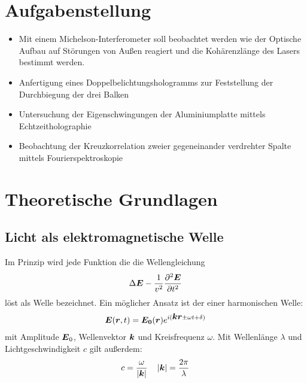 \documentclass[12pt]{article}
\renewcommand*\vec[1]{{\mbox{\boldmath\ensuremath{#1}}}}
\begin{document}
\section{Aufgabenstellung}
\begin{itemize}
 \item Mit einem Michelson-Interferometer soll beobachtet werden wie der Optische Aufbau auf Störungen von Außen reagiert und die Kohärenzlänge des Lasers 
      bestimmt werden.
 \item Anfertigung eines Doppelbelichtungshologramms zur Feststellung der Durchbiegung der drei Balken
 \item Untersuchung der Eigenschwingungen der Aluminiumplatte mittels Echtzeitholographie
 \item Beobachtung der Kreuzkorrelation zweier gegeneinander verdrehter Spalte mittels Fourierspektroskopie
\end{itemize}


\section{Theoretische Grundlagen}
\subsection{Licht als elektromagnetische Welle}
Im Prinzip wird jede Funktion die die Wellengleichung
\begin{align}
 \Delta \vec{E} - \frac{1}{v^2} \frac{\partial^2 \vec{E}}{\partial t^2}
\end{align}
löst als Welle bezeichnet. Ein möglicher Ansatz ist der einer harmonischen Welle:
\begin{align}
 \vec{E}(\vec{r},t) = \vec{E_0}(\vec{r}) e^{i(\vec k \vec r \pm \omega t + \delta)}
\end{align}
mit Amplitude $\vec E_0$, Wellenvektor $\vec k$ und Kreisfrequenz $\omega$.
Mit Wellenlänge $\lambda$ und Lichtgeschwindigkeit $c$ gilt außerdem:
\begin{align*}
 c = \frac{\omega}{\left| \vec k \right|} \quad \left|\vec k \right| = \frac{2\pi}{\lambda}
\end{align*}
\end{document}
